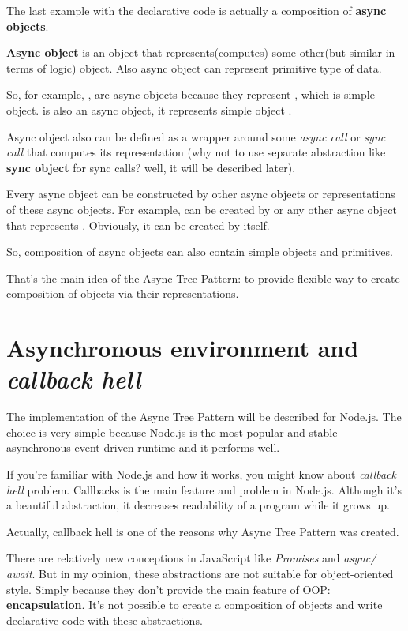 \documentclass{article}
\newcommand{\cit}[1]{{\fontfamily{qcr}\selectfont{\textcolor{superdarkgray}{#1}}}}
\begin{document}
The last example with the declarative code is actually a composition of \textbf{async objects}.

\textbf{Async object} is an object that represents(computes) some other(but similar in terms of logic) object. Also async object can represent primitive type of data.

So, for example, \cit{SavedAccount}, \cit{CreatedAccount} are async objects because they represent \cit{Account}, which is simple object. \cit{UserFromDb} is also an async object, it represents simple object \cit{User}.

Async object also can be defined as a wrapper around some \textit{async call} or \textit{sync call} that computes its representation (why not to use separate abstraction like \textbf{sync object} for sync calls? well, it will be described later).

Every async object can be constructed by other async objects or representations of these async objects. For example, \cit{SavedAccount} can be created by \cit{CreatedAccount} or any other async object that represents \cit{Account}. Obviously, it can be created by \cit{Account} itself.

So, composition of async objects can also contain simple objects and primitives.

That's the main idea of the Async Tree Pattern: to provide flexible way to create composition of objects via their representations.

\section{Asynchronous environment and \textit{callback hell}}

The implementation of the Async Tree Pattern will be described for Node.js. The choice is very simple because Node.js is the most popular and stable asynchronous  event driven runtime and it performs well.

If you're familiar with Node.js and how it works, you might know about \textit{callback hell} problem. Callbacks is the main feature and problem in Node.js. Although it's a beautiful abstraction, it decreases readability of a program while it grows up.

Actually, callback hell is one of the reasons why Async Tree Pattern was created.

There are relatively new conceptions in JavaScript like \textit{Promises} and  \textit{async/ await}. But in my opinion, these abstractions are not suitable for object-oriented style. Simply because they don't provide the main feature of OOP: \textbf{encapsulation}. 
It's not possible to create a composition of objects and write declarative code with these abstractions.
\end{document}
